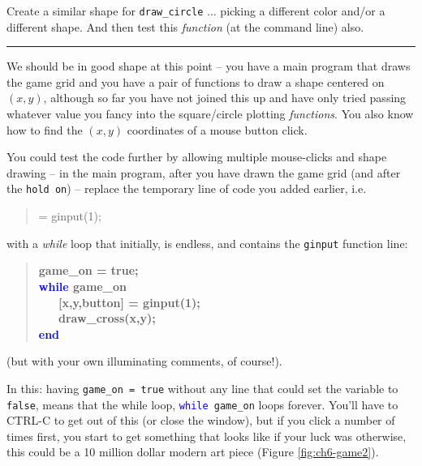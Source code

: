 \documentclass{tufte-book} %
\newenvironment{docspec}{\begin{quotation}\ttfamily\parskip0pt\parindent0pt\ignorespaces}{\end{quotation}}
\newenvironment{docspecbold}{\begin{quotation}\ttfamily\bfseries\parskip0pt\parindent0pt\ignorespaces}{\end{quotation}}
\begin{document}
Create a similar shape for \texttt{draw\_circle} ...  picking a different color and/or a different shape. And then test this \textit{function} (at the command line) also.

\vspace{1mm}
\noindent\rule{4cm}{0.5pt}
\vspace{2mm}

\noindent We should be in good shape at this point -- you have a main program that draws the game grid and  you have a pair of functions to draw a shape centered on \((x,y)\), although so far you have not joined this up and have only tried passing whatever value you fancy into the square/circle plotting \textit{functions}.
You also know how to find the \((x,y)\) coordinates of a mouse button click. 

You could test the code further by allowing multiple mouse-clicks and shape drawing -- in the main program, after you have drawn the game grid (and after the \texttt{hold on}) -- replace the temporary line of code you added earlier, i.e.
\vspace{-1mm}\begin{docspec}
[x,y,button] = ginput(1);
\end{docspec}\vspace{-1mm}
with a \textit{while} loop that initially, is endless, and contains the \texttt{ginput} function line:
\begin{docspecbold}
game\_on = true;\\
\textcolor{blue}{while} game\_on\\
\ \ \    [x,y,button] = ginput(1);\\
\ \ \    draw\_cross(x,y);\\    
\textcolor{blue}{end}
\end{docspecbold}
(but with your own illuminating  comments, of course!).

In this: having \texttt{game\_on = true} without any line that could set the variable to \texttt{false}, means that the while loop, \texttt{\textcolor{blue}{while} game\_on} loops forever. You'll have to \textsf{CTRL-C} to get out of this (or close the window), but if you click a number of times first, you start to get something that looks like if your luck was otherwise, this could be a 10 million dollar modern art piece (Figure \ref{fig:ch6-game2}).
\end{document}
